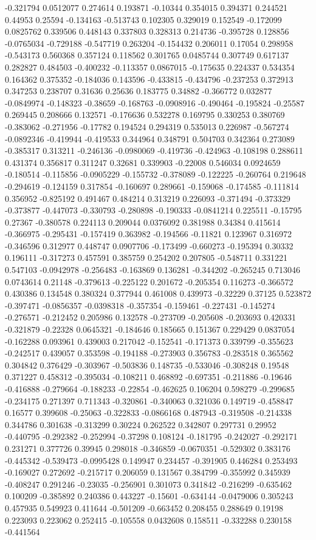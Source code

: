 -0.321794 0.0512077 0.274614 0.193871 -0.10344 0.354015 0.394371 0.244521 0.44953 0.25594 -0.134163 -0.513743 0.102305 0.329019 0.152549 -0.172099 0.0825762 0.339506 0.448143 0.337803 0.328313 0.214736 -0.395728 0.128856 -0.0765034 -0.729188 -0.547719 0.263204 -0.154432 0.206011 0.17054 0.298958 -0.543173 0.560368 0.357124 0.118562 0.301765 0.0485744 0.307749 0.617137 0.282827 0.484503 -0.400232 -0.113357 0.0867015 -0.175635 0.224337 0.534354 0.164362 0.375352 -0.184036 0.143596 -0.433815 -0.434796 -0.237253 0.372913 0.347253 0.238707 0.31636 0.25636 0.183775 0.34882 -0.366772 0.032877 -0.0849974 -0.148323 -0.38659 -0.168763 -0.0908916 -0.490464 -0.195824 -0.25587 0.269445 0.208666 0.132571 -0.176636 0.532278 0.169795 0.330253 0.380769 -0.383062 -0.271956 -0.17782 0.194524 0.294319 0.535013 0.226987 -0.567274 -0.0892346 -0.419944 -0.419533 0.344964 0.348791 0.504703 0.342364 0.273089 -0.385317 0.313211 -0.246136 -0.0980069 -0.419736 -0.424963 -0.108198 0.288611 0.431374 0.356817 0.311247 0.32681 0.339903 -0.22008 0.546034 0.0924659 -0.180514 -0.115856 -0.0905229 -0.155732 -0.378089 -0.122225 -0.260764 0.219648 -0.294619 -0.124159 0.317854 -0.160697 0.289661 -0.159068 -0.174585 -0.111814 0.356952 -0.825192 0.491467 0.484214 0.313219 0.226093 -0.371494 -0.373329 -0.373877 -0.447073 -0.330793 -0.280898 -0.190333 -0.0841214 0.225511 -0.15795 0.27367 -0.380578 0.224113 0.209044 0.0376092 0.381988 0.34384 0.415614 -0.366975 -0.295431 -0.157419 0.363982 -0.194566 -0.11821 0.123967 0.316972 -0.346596 0.312977 0.448747 0.0907706 -0.173499 -0.660273 -0.195394 0.30332 0.196111 -0.317273 0.457591 0.385759 0.254202 0.207805 -0.548711 0.331221 0.547103 -0.0942978 -0.256483 -0.163869 0.136281 -0.344202 -0.265245 0.713046 0.0743614 0.21148 -0.379613 -0.225122 0.201672 -0.205354 0.116273 -0.366572 0.430386 0.134548 0.380324 0.377944 0.461008 0.439973 -0.32229 0.37125 0.523872 -0.397471 -0.0856357 -0.0398318 -0.357354 -0.159461 -0.227431 -0.145274 -0.276571 -0.212452 0.205986 0.132578 -0.273709 -0.205608 -0.203693 0.420331 -0.321879 -0.22328 0.0645321 -0.184646 0.185665 0.151367 0.229429 0.0837054 -0.162288 0.093961 0.439003 0.217042 -0.152541 -0.171373 0.339799 -0.355623 -0.242517 0.439057 0.353598 -0.194188 -0.273903 0.356783 -0.283518 0.365562 0.304842 0.376429 -0.303967 -0.503836 0.148735 -0.533046 -0.308248 0.19548 0.371227 0.458312 -0.395034 -0.108211 0.468892 -0.697351 -0.211886 -0.19646 -0.416888 -0.279664 -0.188233 -0.22854 -0.462625 0.106204 0.598279 -0.299685 -0.234175 0.271397 0.711343 -0.320861 -0.340063 0.321036 0.149719 -0.458847 0.16577 0.399608 -0.25063 -0.322833 -0.0866168 0.487943 -0.319508 -0.214338 0.344786 0.301638 -0.313299 0.30224 0.262522 0.342807 0.297731 0.29952 -0.440795 -0.292382 -0.252994 -0.37298 0.108124 -0.181795 -0.242027 -0.292171 0.231271 0.377726 0.39945 0.298018 -0.346859 -0.0670351 -0.529302 0.383176 -0.445342 -0.539473 -0.0995428 0.149947 0.234457 -0.391905 0.446284 0.253493 -0.169027 0.272692 -0.215717 0.206059 0.131567 0.384799 -0.355992 0.345939 -0.408247 0.291246 -0.23035 -0.256901 0.301073 0.341842 -0.216299 -0.635462 0.100209 -0.385892 0.240386 0.443227 -0.15601 -0.634144 -0.0479006 0.305243 0.457935 0.549923 0.411644 -0.501209 -0.663452 0.208455 0.288649 0.19198 0.223093 0.223062 0.252415 -0.105558 0.0432608 0.158511 -0.332288 0.230158 -0.441564 